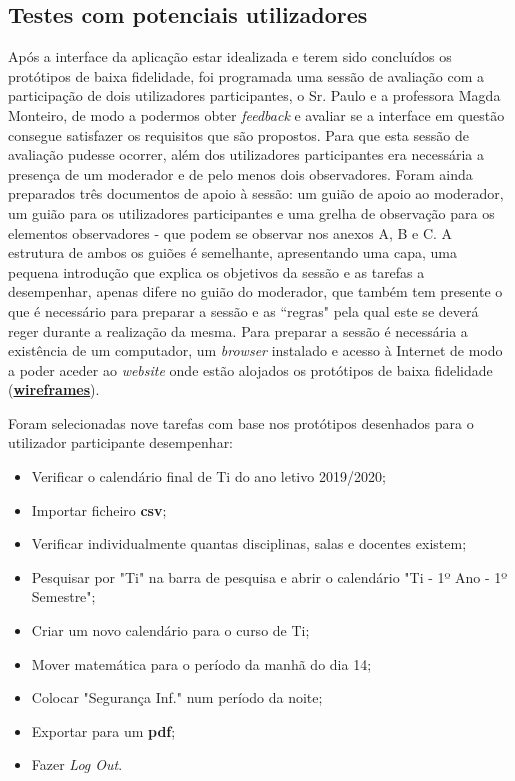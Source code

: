 \documentclass[11pt, twoside]{report}
\begin{document}
	\subsection{Testes com potenciais utilizadores}
	\label{primeiroTeste}
		Após a interface da aplicação estar idealizada e terem sido concluídos os protótipos de baixa fidelidade, foi programada uma sessão de avaliação com a participação de dois utilizadores participantes, o Sr. Paulo e a professora Magda Monteiro, de modo a podermos obter \textit{feedback} e avaliar se a interface em questão consegue satisfazer os requisitos que são propostos. Para que esta sessão de avaliação pudesse ocorrer, além dos utilizadores participantes era necessária a presença de um moderador e de pelo menos dois observadores. Foram ainda preparados três documentos de apoio à sessão: um guião de apoio ao moderador, um guião para os utilizadores participantes e uma grelha de observação para os elementos observadores - que podem se observar nos anexos A, B e C. A estrutura de ambos os guiões é semelhante, apresentando uma capa, uma pequena introdução que explica os objetivos da sessão e as tarefas a desempenhar, apenas difere no guião do moderador, que também tem presente o que é necessário para preparar a sessão e as ``regras" pela qual este se deverá reger durante a realização da mesma. Para preparar a sessão é necessária a existência de um computador, um \textit{browser} instalado e acesso à Internet de modo a poder aceder ao \textit{website} onde estão alojados os protótipos de baixa fidelidade (\href{https://www.figma.com/file/nhb5nnIrt3fdDoQhYpsN80/Calendario?node-id=9\%3A154}{\textbf{wireframes}}).

Foram selecionadas nove tarefas com base nos protótipos desenhados para o utilizador participante desempenhar:

\begin{itemize}
	\item Verificar o calendário final de Ti do ano letivo 2019/2020;
	\item Importar ficheiro \textbf{csv};
	\item Verificar individualmente quantas disciplinas, salas e docentes existem;
	\item Pesquisar por "Ti" na barra de pesquisa e abrir o calendário "Ti - 1º Ano - 1º Semestre";
	\item Criar um novo calendário para o curso de Ti;
	\item Mover matemática para o período da manhã do dia 14;
	\item Colocar "Segurança Inf." num período da noite;
	\item Exportar para um \textbf{pdf};
	\item Fazer \textit{Log Out}.
\end{itemize}
\end{document}
